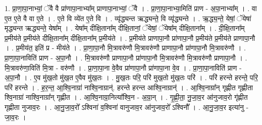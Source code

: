 \documentclass[17pt]{extarticle}
\begin{document}
1. प्रा॒णा॒पा॒नाभ्यां॒ ॅवै वै प्रा॑णापा॒नाभ्या᳚म् प्राणापा॒नाभ्यां॒ ॅवै । . प्रा॒णा॒पा॒नाभ्या॒मिति॑ प्राण - अ॒पा॒नाभ्या᳚म् । . वा ए॒त ए॒ते वै वा ए॒ते । . ए॒ते वि व्ये॑त ए॒ते वि । . व्यृ॑द्ध्यन्त ऋद्ध्यन्ते॒ वि व्यृ॑द्ध्यन्ते । . ऋ॒द्ध्य॒न्ते॒ येषां॒ ॅयेषा॑ मृद्ध्यन्त ऋद्ध्यन्ते॒ येषा᳚म् । . येषा᳚म् दीक्षि॒ताना᳚म् दीक्षि॒तानां॒ ॅयेषां॒ ॅयेषा᳚म् दीक्षि॒ताना᳚म् । . दी॒क्षि॒ताना᳚म् प्र॒मीय॑ते प्र॒मीय॑ते दीक्षि॒ताना᳚म् दीक्षि॒ताना᳚म् प्र॒मीय॑ते । . प्र॒मीय॑ते प्राणापा॒नौ प्रा॑णापा॒नौ प्र॒मीय॑ते प्र॒मीय॑ते प्राणापा॒नौ । . प्र॒मीय॑त॒ इति॑ प्र - मीय॑ते । . प्रा॒णा॒पा॒नौ मि॒त्रावरु॑णौ मि॒त्रावरु॑णौ प्राणापा॒नौ प्रा॑णापा॒नौ मि॒त्रावरु॑णौ । . प्रा॒णा॒पा॒नाविति॑ प्राण - अ॒पा॒नौ । . मि॒त्रावरु॑णौ प्राणापा॒नौ प्रा॑णापा॒नौ मि॒त्रावरु॑णौ मि॒त्रावरु॑णौ प्राणापा॒नौ । . मि॒त्रावरु॑णा॒विति॑ मि॒त्रा - वरु॑णौ । . प्रा॒णा॒पा॒ना वे॒वैव प्रा॑णापा॒नौ प्रा॑णापा॒ना वे॒व । . प्रा॒णा॒पा॒नाविति॑ प्राण - अ॒पा॒नौ । . ए॒व मु॑ख॒तो मु॑ख॒त ए॒वैव मु॑ख॒तः । . मु॒ख॒तः परि॒ परि॑ मुख॒तो मु॑ख॒तः परि॑ । . परि॑ हरन्ते हरन्ते॒ परि॒ परि॑ हरन्ते । . ह॒र॒न्त॒ आ॒श्वि॒नाग्रा॑ नाश्वि॒नाग्रान्॑. हरन्ते हरन्त आश्वि॒नाग्रान्॑ । . आ॒श्वि॒नाग्रा᳚न् गृह्णीत गृह्णीता श्वि॒नाग्रा॑ नाश्वि॒नाग्रा᳚न् गृह्णीत । . आ॒श्वि॒नाग्रा॒नित्या᳚श्वि॒न - अ॒ग्रा॒न् । . गृ॒ह्णी॒ता॒ नु॒जा॒व॒र आ॑नुजाव॒रो गृ॑ह्णीत गृह्णीता नुजाव॒रः । . आ॒नु॒जा॒व॒रो᳚ ऽश्विना॑ व॒श्विना॑ वानुजाव॒र आ॑नुजाव॒रो᳚ ऽश्विनौ᳚ । . आ॒नु॒जा॒व॒र इत्या॑नु - जा॒व॒रः । \newline
\end{document}
